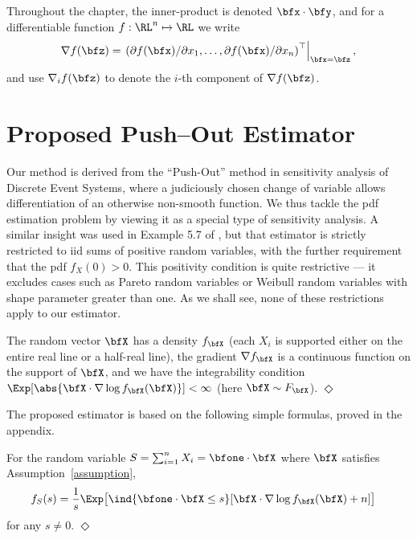 Throughout the chapter, the inner-product is denoted $\bfx \cdot \bfy$, and for a differentiable function $f: \RL^n\mapsto \RL$ we write
\[ \nabla f(\bfz) = \left. \left( \partial f(\bfx) / \partial x_1 , \dots, \partial f(\bfx) / \partial x_n \right)^\top \right\vert_{\bfx = \bfz}, \]
and use $\nabla_i f(\bfz)$ to denote the $i$-th component of $\nabla f(\bfz)$.


\section{Proposed Push--Out Estimator} \label{sec:GeneralSetup}
Our method is derived from the ``Push-Out'' method \cite{RubinsteinReuven1992Saod,kroese2007solutions} in  sensitivity analysis of Discrete Event Systems, where a judiciously chosen change of variable  allows differentiation of an otherwise non-smooth function. We thus tackle the pdf estimation problem by
viewing it as a special type of  sensitivity analysis.
A similar insight was used in  Example 5.7 of \cite{
asmussen2007stochastic}, but that estimator is strictly
restricted to iid sums of positive random variables, with the
further requirement that the pdf $f_X(0) > 0$. This positivity
condition is quite restrictive ---  it excludes cases such as
Pareto random variables or  Weibull random variables with shape parameter greater than
one. As we shall see, none of these restrictions apply to our
estimator.




\begin{assumption} \label{assumption}
The random vector $\bfX$ has a density $f_{\bfX}$  (each $X_i$ is supported either on the entire real line or a half-real line), the gradient $\nabla f_{\bfX}$ is a continuous function on the  support of $\bfX$, and we have the integrability condition
$\Exp[ \abs{ \bfX \cdot \nabla \log f_{\bfX}(\bfX) } ] <\infty$
(here $\bfX\sim F_{\bfX}$). \hfill $\Diamond$
\end{assumption}
The proposed estimator is based on the following  simple formulas, proved in the appendix.
\begin{proposition} \label{prop:DensityRepresentation}
For the random variable $S = \sum_{i=1}^n X_i = \bfone \cdot \bfX$ where $\bfX$ satisfies Assumption~\ref{assumption},
\begin{align} \label{Pushout}
f_S(s) &= \frac{1}{s} \Exp \bigl[ \ind{\bfone \cdot \bfX \le s} [ \bfX \cdot \nabla \log f_{\bfX}(\bfX) + n ] \bigr]
\end{align}
for any $s \not= 0$. \hfill $\Diamond$
\end{proposition}


